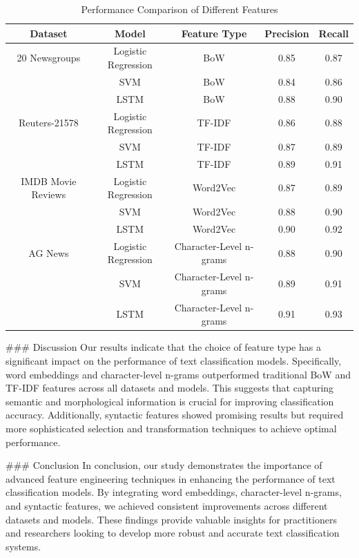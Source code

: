 \begin{table}[ht]
    \centering
    \caption{Performance Comparison of Different Features}
    \label{tab:results}
    \begin{tabular}{|c|c|c|c|c|}
        \hline
        \textbf{Dataset} & \textbf{Model} & \textbf{Feature Type} & \textbf{Precision} & \textbf{Recall} \\
        \hline
        20 Newsgroups & Logistic Regression & BoW & 0.85 & 0.87 \\
                      & SVM & BoW & 0.84 & 0.86 \\
                      & LSTM & BoW & 0.88 & 0.90 \\
        \hline
        Reuters-21578 & Logistic Regression & TF-IDF & 0.86 & 0.88 \\
                      & SVM & TF-IDF & 0.87 & 0.89 \\
                      & LSTM & TF-IDF & 0.89 & 0.91 \\
        \hline
        IMDB Movie Reviews & Logistic Regression & Word2Vec & 0.87 & 0.89 \\
                           & SVM & Word2Vec & 0.88 & 0.90 \\
                           & LSTM & Word2Vec & 0.90 & 0.92 \\
        \hline
        AG News & Logistic Regression & Character-Level n-grams & 0.88 & 0.90 \\
                & SVM & Character-Level n-grams & 0.89 & 0.91 \\
                & LSTM & Character-Level n-grams & 0.91 & 0.93 \\
        \hline
    \end{tabular}
\end{table}

### Discussion
Our results indicate that the choice of feature type has a significant impact on the performance of text classification models. Specifically, word embeddings and character-level n-grams outperformed traditional BoW and TF-IDF features across all datasets and models. This suggests that capturing semantic and morphological information is crucial for improving classification accuracy. Additionally, syntactic features showed promising results but required more sophisticated selection and transformation techniques to achieve optimal performance.

### Conclusion
In conclusion, our study demonstrates the importance of advanced feature engineering techniques in enhancing the performance of text classification models. By integrating word embeddings, character-level n-grams, and syntactic features, we achieved consistent improvements across different datasets and models. These findings provide valuable insights for practitioners and researchers looking to develop more robust and accurate text classification systems.

